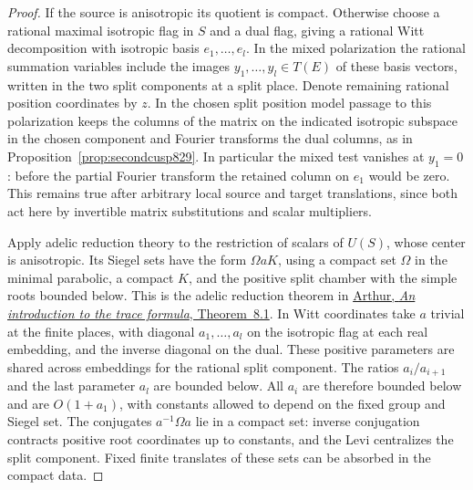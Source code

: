 \documentclass[a4paper,11pt]{article}
\theoremstyle{definition}
\theoremstyle{remark}
\numberwithin{equation}{section}
\begin{document}
\begin{proof}
If the source is anisotropic its quotient is compact. Otherwise
choose a rational maximal isotropic flag in \(S\) and a dual
flag, giving a rational Witt decomposition with isotropic
basis \(e_1,\ldots,e_l\). In the mixed polarization the
rational summation variables include the images
\(y_1,\ldots,y_l\in T(E)\) of these basis vectors, written
in the two split components at a split place. Denote remaining
rational position coordinates by \(z\). In the chosen split
position model passage to this polarization keeps the columns
of the matrix on the indicated isotropic subspace in the
chosen component and Fourier transforms the dual columns,
as in Proposition~\ref{prop:secondcusp829}. In particular
the mixed test vanishes at \(y_1=0\): before the partial
Fourier transform the retained column on \(e_1\) would be
zero. This remains true after arbitrary local source and
target translations, since both act here by invertible
matrix substitutions and scalar multipliers.

Apply adelic reduction theory to the restriction of scalars
of \(U(S)\), whose center is anisotropic. Its Siegel sets
have the form \(\Omega aK\), using a compact set \(\Omega\)
in the minimal parabolic, a compact \(K\), and the positive
split chamber with the simple roots bounded below. This is
the adelic reduction theorem in
\href{https://www.claymath.org/library/cw/arthur/pdf/61.pdf}
{Arthur, \emph{An introduction to the trace formula},
Theorem~8.1}. In Witt coordinates take \(a\) trivial at
the finite places, with diagonal \(a_1,\ldots,a_l\) on
the isotropic flag at each real embedding, and the inverse
diagonal on the dual. These positive parameters are shared
across embeddings for the rational split component. The
ratios \(a_i/a_{i+1}\) and the last parameter \(a_l\) are
bounded below. All \(a_i\) are therefore bounded below and
are \(O(1+a_1)\), with constants allowed to depend on the
fixed group and Siegel set. The conjugates \(a^{-1}\Omega a\)
lie in a compact set: inverse conjugation contracts positive
root coordinates up to constants, and the Levi centralizes
the split component. Fixed finite translates of these sets
can be absorbed in the compact data.


\end{proof}
\end{document}
